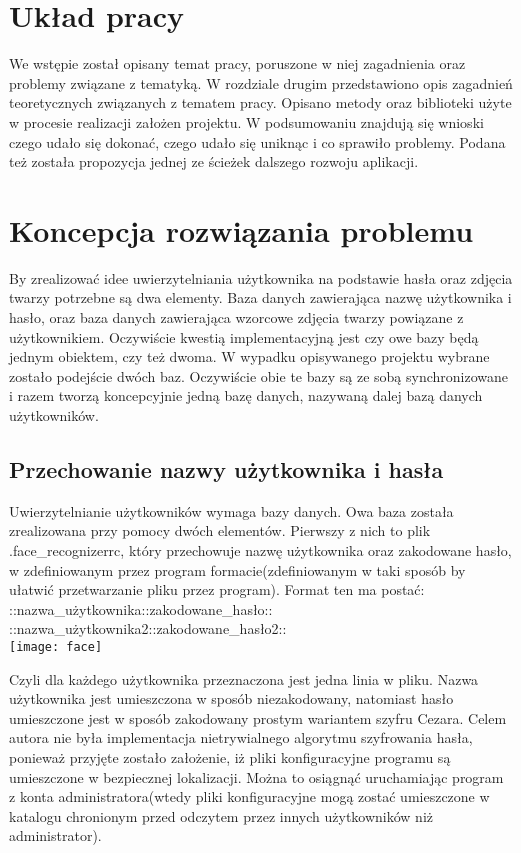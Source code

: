 \documentclass[eng,printmode]{mgr}
\begin{document}
\section{Układ pracy}
We wstępie został opisany temat pracy, poruszone w niej zagadnienia oraz problemy związane z tematyką. W rozdziale drugim przedstawiono opis zagadnień teoretycznych związanych z tematem pracy. Opisano metody oraz biblioteki użyte w procesie realizacji założen projektu. W podsumowaniu znajdują się wnioski czego udało się dokonać, czego udało się uniknąc i co sprawiło problemy. Podana też została propozycja jednej ze ścieżek dalszego rozwoju aplikacji.
\section{Koncepcja rozwiązania problemu}
By zrealizować idee uwierzytelniania użytkownika na podstawie hasła oraz zdjęcia twarzy potrzebne są dwa elementy. Baza danych zawierająca nazwę użytkownika i hasło, oraz baza danych zawierająca wzorcowe zdjęcia twarzy powiązane z użytkownikiem. Oczywiście kwestią implementacyjną jest czy owe bazy będą jednym obiektem, czy też dwoma. W wypadku opisywanego projektu wybrane zostało podejście dwóch baz. Oczywiście obie te bazy są ze sobą synchronizowane i razem tworzą koncepcyjnie jedną bazę danych, nazywaną dalej bazą danych użytkowników.
\subsection{Przechowanie nazwy użytkownika i hasła}
Uwierzytelnianie użytkowników wymaga bazy danych. Owa baza została zrealizowana przy pomocy dwóch elementów. Pierwszy z nich to plik .face\_recognizerrc, który przechowuje nazwę użytkownika oraz zakodowane hasło, w zdefiniowanym przez program formacie(zdefiniowanym w taki sposób by ułatwić przetwarzanie pliku przez program). Format ten ma postać:\\
::nazwa\_użytkownika::zakodowane\_hasło::\\
::nazwa\_użytkownika2::zakodowane\_hasło2::
\\
\texttt{[image: face]}


Czyli dla każdego użytkownika przeznaczona jest jedna linia w pliku. Nazwa użytkownika jest umieszczona w sposób niezakodowany, natomiast hasło umieszczone jest w sposób zakodowany prostym wariantem szyfru Cezara. Celem autora nie była implementacja nietrywialnego algorytmu szyfrowania hasła, ponieważ przyjęte zostało założenie, iż pliki konfiguracyjne programu są umieszczone w bezpiecznej lokalizacji. Można to osiągnąć uruchamiając program z konta administratora(wtedy pliki konfiguracyjne mogą zostać umieszczone w katalogu chronionym przed odczytem przez innych użytkowników niż administrator).
\\
\end{document}
